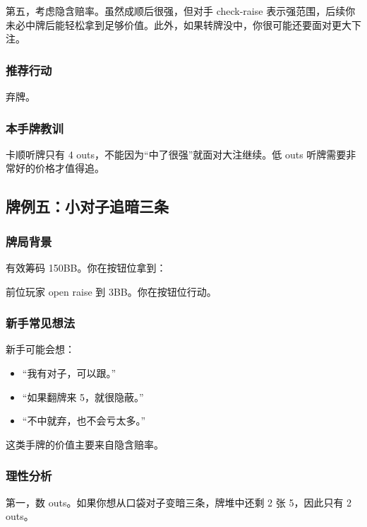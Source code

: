 第五，考虑隐含赔率。虽然成顺后很强，但对手 check-raise 表示强范围，后续你未必中牌后能轻松拿到足够价值。此外，如果转牌没中，你很可能还要面对更大下注。

\subsubsection*{推荐行动}

弃牌。

\subsubsection*{本手牌教训}

卡顺听牌只有 4 outs，不能因为“中了很强”就面对大注继续。低 outs 听牌需要非常好的价格才值得追。

\subsection{牌例五：小对子追暗三条}

\subsubsection*{牌局背景}

有效筹码 150BB。你在按钮位拿到：

\begin{center}
\end{center}

前位玩家 open raise 到 3BB。你在按钮位行动。

\subsubsection*{新手常见想法}

新手可能会想：

\begin{itemize}
\item “我有对子，可以跟。”
\item “如果翻牌来 5，就很隐蔽。”
\item “不中就弃，也不会亏太多。”
\end{itemize}

这类手牌的价值主要来自隐含赔率。

\subsubsection*{理性分析}

第一，数 outs。如果你想从口袋对子变暗三条，牌堆中还剩 2 张 5，因此只有 2 outs。

